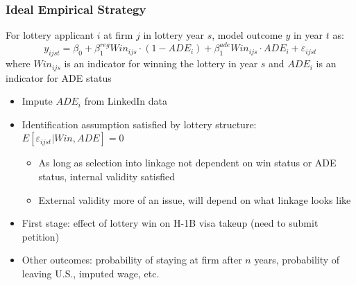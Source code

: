 \documentclass[xcolor=dvipsnames, compress, 12pt, aspectratio=169, handout]{beamer}
\begin{document}
\begin{frame}
    \frametitle{Ideal Empirical Strategy}
    For lottery applicant $i$ at firm $j$ in lottery year $s$, model outcome $y$ in year $t$ as:
    $$y_{ijst} = \beta_0 + \beta_1^{reg} Win_{ijs} \cdot (1-ADE_i) + \beta_1^{ade} Win_{ijs}\cdot ADE_i + \varepsilon_{ijst}$$
    where $Win_{ijs}$ is an indicator for winning the lottery in year $s$ and $ADE_i$ is an indicator for ADE status
    \begin{itemize}
        \item Impute $ADE_i$ from LinkedIn data 
        \item Identification assumption satisfied by lottery structure: $E[\varepsilon_{ijst}|Win, ADE] = 0$
        \begin{itemize}
            \item As long as selection into linkage not dependent on win status or ADE status, internal validity satisfied 
            \item External validity more of an issue, will depend on what linkage looks like 
        \end{itemize}
        \item First stage: effect of lottery win on H-1B visa takeup (need to submit petition)
        \item Other outcomes: probability of staying at firm after $n$ years, probability of leaving U.S., imputed wage, etc. 
    \end{itemize}
\end{frame}
\end{document}
